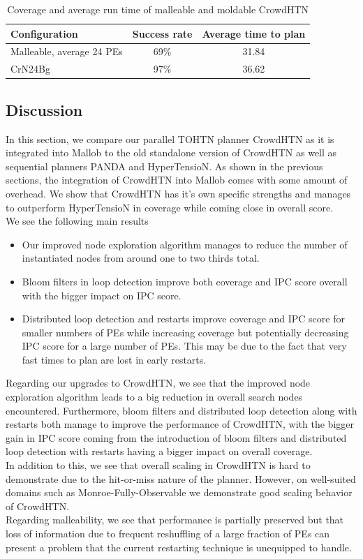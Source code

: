 \begin{table}[!hbp]
	\caption{Coverage and average run time of malleable and moldable CrowdHTN}
	\label{table: malleability}
	\centering
	
	\begin{tabular}{|l|c|c|}
		\hline
		Configuration & Success rate & Average time to plan \\
		\hline
		Malleable, average 24 PEs	& 69\%	& 31.84 \\
		CrN24Bg						& 97\%  & 36.62 \\
		\hline
	\end{tabular}
\end{table}

\subsection{Discussion}
\label{eval: conclusion}
In this section, we compare our parallel TOHTN planner CrowdHTN as it is integrated into Mallob to the old standalone version of CrowdHTN as well as sequential planners PANDA and HyperTensioN. As shown in the previous sections, the integration of CrowdHTN into Mallob comes with some amount of overhead. We show that CrowdHTN has it's own specific strengths and manages to outperform HyperTensioN in coverage while coming close in overall score. \\
We see the following main results
\begin{itemize}
	\item Our improved node exploration algorithm manages to reduce the number of instantiated nodes from around one to two thirds total.
	\item Bloom filters in loop detection improve both coverage and IPC score overall with the bigger impact on IPC score.
	\item Distributed loop detection and restarts improve coverage and IPC score for smaller numbers of PEs while increasing coverage but potentially decreasing IPC score for a large number of PEs. This may be due to the fact that very fast times to plan are lost in early restarts.
\end{itemize}
Regarding our upgrades to CrowdHTN, we see that the improved node exploration algorithm leads to a big reduction in overall search nodes encountered. Furthermore, bloom filters and distributed loop detection along with restarts both manage to improve the performance of CrowdHTN, with the bigger gain in IPC score coming from the introduction of bloom filters and distributed loop detection with restarts having a bigger impact on overall coverage. \\
In addition to this, we see that overall scaling in CrowdHTN is hard to demonstrate due to the hit-or-miss nature of the planner. However, on well-suited domains such as Monroe-Fully-Observable we demonstrate good scaling behavior of CrowdHTN. \\
Regarding malleability, we see that performance is partially preserved but that loss of information due to frequent reshuffling of a large fraction of PEs can present a problem that the current restarting technique is unequipped to handle.

